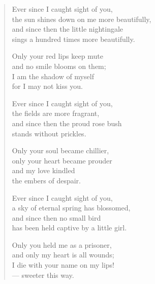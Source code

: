 \documentclass[11pt]{book}
\newcommand*{\centeredornament}{\centerline{\pgfornament[width=6cm]{88}}}
\begin{document}
\begin{verse}
  Ever since I caught sight of you, \\
  the sun shines down on me more beautifully, \\
  and since then the little nightingale \\
  sings a hundred times more beautifully.

  Only your red lips keep mute \\
  and no smile blooms on them; \\
  I am the shadow of myself \\
  for I may not kiss you.

  Ever since I caught sight of you, \\
  the fields are more fragrant, \\
  and since then the proud rose bush \\
  stands without prickles.

  Only your soul became chillier, \\
  only your heart became prouder \\
  and my love kindled \\
  the embers of despair.

  Ever since I caught sight of you, \\
  a sky of eternal spring has blossomed, \\
  and since then no small bird \\
  has been held captive by a little girl.

  Only you held me as a prisoner, \\
  and only my heart is all wounds; \\
  I die with your name on my lips! \\
  --- sweeter this way.
\end{verse}

\newpage

\vspace*{-15mm}
\centeredornament


\end{document}
